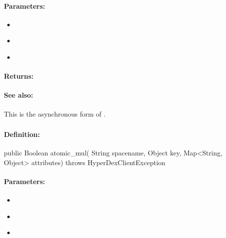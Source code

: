 \paragraph{Parameters:}
\begin{itemize}[noitemsep]
\item {}\\

\item {}\\

\item {}\\

\end{itemize}

\paragraph{Returns:}


\paragraph{See also:}  This is the asynchronous form of .

\pagebreak
\subsubsection{}
\label{api:java:atomic_mul}


\paragraph{Definition:}
\begin{javacode}
public Boolean atomic_mul(
        String spacename,
        Object key,
        Map<String, Object> attributes) throws HyperDexClientException
\end{javacode}

\paragraph{Parameters:}
\begin{itemize}[noitemsep]
\item {}\\

\item {}\\

\item {}\\

\end{itemize}


